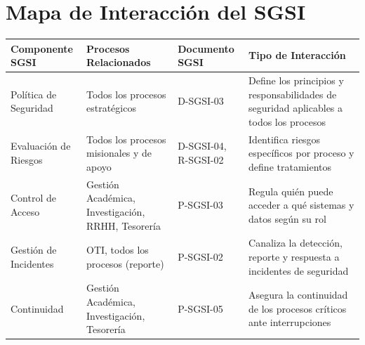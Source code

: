 \documentclass[10pt,letterpaper]{article}
\begin{document}
\section{Mapa de Interacción del
SGSI}\label{mapa-de-interacciuxf3n-del-sgsi}

{\setlength{\RaggedRightRightskip}{0pt plus 5em}\small\sloppy \begin{longtable}[]{@{}
  >{\hspace{0pt}\RaggedRight\arraybackslash}p{}
  >{\hspace{0pt}\RaggedRight\arraybackslash}p{}
  >{\hspace{0pt}\RaggedRight\arraybackslash}p{}
  >{\hspace{0pt}\RaggedRight\arraybackslash}p{}@{}}
\toprule\noalign{}
\begin{minipage}[b]{\linewidth}\raggedright
Componente SGSI
\end{minipage} & \begin{minipage}[b]{\linewidth}\raggedright
Procesos Relacionados
\end{minipage} & \begin{minipage}[b]{\linewidth}\raggedright
Documento SGSI
\end{minipage} & \begin{minipage}[b]{\linewidth}\raggedright
Tipo de Interacción
\end{minipage} \\
\midrule\noalign{}
\endhead
\bottomrule\noalign{}
\endlastfoot
Política de Seguridad & Todos los procesos estratégicos & D-SGSI-03 &
Define los principios y responsabilidades de seguridad aplicables a
todos los procesos \\
Evaluación de Riesgos & Todos los procesos misionales y de apoyo &
D-SGSI-04, R-SGSI-02 & Identifica riesgos específicos por proceso y
define tratamientos \\
Control de Acceso & Gestión Académica, Investigación, RRHH, Tesorería &
P-SGSI-03 & Regula quién puede acceder a qué sistemas y datos según su
rol \\
Gestión de Incidentes & OTI, todos los procesos (reporte) & P-SGSI-02 &
Canaliza la detección, reporte y respuesta a incidentes de seguridad \\
Continuidad & Gestión Académica, Investigación, Tesorería & P-SGSI-05 &
Asegura la continuidad de los procesos críticos ante interrupciones \\

\end{longtable}}
\end{document}
